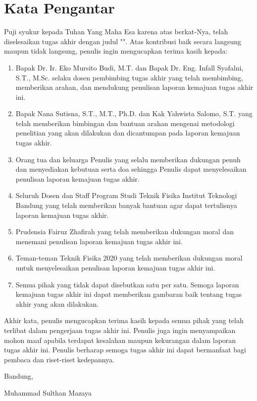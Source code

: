 \chapter*{Kata Pengantar}

Puji syukur kepada Tuhan Yang Maha Esa karena atas berkat-Nya, telah diselesaikan tugas akhir dengan judul "\thetitle".
Atas kontribusi baik secara langsung maupun tidak langsung, penulis ingin
mengucapkan terima kasih kepada:

\begin{enumerate}
	\item Bapak Dr. Ir. Eko Mursito Budi, M.T. dan Bapak Dr. Eng. Infall Syafalni, S.T., M.Sc. selaku dosen pembimbing tugas akhir yang telah membimbing, memberikan arahan, dan mendukung penulisan laporan kemajuan tugas akhir ini.
	\item Bapak Nana Sutisna, S.T., M.T., Ph.D. dan Kak Yahwista Salomo, S.T. yang telah memberikan bimbingan dan bantuan arahan mengenai metodologi penelitian yang akan dilakukan dan dicantumpan pada laporan kemajuan tugas akhir.
	\item Orang tua dan keluarga Penulis yang selalu memberikan dukungan penuh dan menyediakan kebutuan serta doa sehingga Penulis dapat menyelesaikan penulisan laporan kemajuan tugas akhir.
	\item Seluruh Dosen dan Staff Program Studi Teknik Fisika Institut Teknologi Bandung yang telah memberikan banyak bantuan agar dapat tertulisnya laporan kemajuan tugas akhir.
	\item Prudensia Fairuz Zhafirah yang telah memberikan dukungan moral dan menemani penulisan laporan kemajuan tugas akhir ini.
	\item Teman-teman Teknik Fisika 2020 yang telah memberikan dukungan moral untuk menyelesaikan penulisan laporan kemajuan tugas akhir ini.
	\item Semua pihak yang tidak dapat disebutkan satu per satu. Semoga laporan kemajuan tugas akhir ini dapat memberikan gambaran baik tentang tugas akhir yang akan dilakukan.
\end{enumerate}

Akhir kata, penulis mengucapkan terima kasih kepada semua pihak yang telah terlibat dalam pengerjaan tugas akhir ini. Penulis juga ingin menyampaikan mohon maaf apabila terdapat kesalahan maupun kekurangan dalam laporan tugas akhir ini. Penulis berharap semoga tugas akhir ini dapat bermanfaat bagi pembaca dan riset-riset kedepannya.

\begin{flushright}
	\vspace{0.5cm}
	Bandung, \tanggalpengesahan
	
	
	\vspace{1.5cm}
	
	Muhammad Sulthan Mazaya
\end{flushright}
